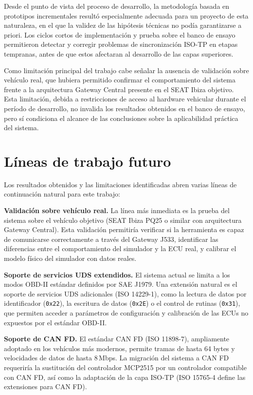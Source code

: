 Desde el punto de vista del proceso de desarrollo, la metodología basada en prototipos incrementales resultó especialmente adecuada para un proyecto de esta naturaleza, en el que la validez de las hipótesis técnicas no podía garantizarse a priori. Los ciclos cortos de implementación y prueba sobre el banco de ensayo permitieron detectar y corregir problemas de sincronización ISO-TP en etapas tempranas, antes de que estos afectaran al desarrollo de las capas superiores.

Como limitación principal del trabajo cabe señalar la ausencia de validación sobre vehículo real, que hubiera permitido confirmar el comportamiento del sistema frente a la arquitectura Gateway Central presente en el SEAT Ibiza objetivo. Esta limitación, debida a restricciones de acceso al hardware vehicular durante el período de desarrollo, no invalida los resultados obtenidos en el banco de ensayo, pero sí condiciona el alcance de las conclusiones sobre la aplicabilidad práctica del sistema.


\section{Líneas de trabajo futuro}
\label{sec:trabajo_futuro}

Los resultados obtenidos y las limitaciones identificadas abren varias líneas de continuación natural para este trabajo:

\textbf{Validación sobre vehículo real.} La línea más inmediata es la prueba del sistema sobre el vehículo objetivo (SEAT Ibiza PQ25 o similar con arquitectura Gateway Central). Esta validación permitiría verificar si la herramienta es capaz de comunicarse correctamente a través del Gateway J533, identificar las diferencias entre el comportamiento del simulador y la ECU real, y calibrar el modelo físico del simulador con datos reales.

\textbf{Soporte de servicios UDS extendidos.} El sistema actual se limita a los modos OBD-II estándar definidos por SAE J1979. Una extensión natural es el soporte de servicios UDS adicionales (ISO 14229-1), como la lectura de datos por identificador (\texttt{0x22}), la escritura de datos (\texttt{0x2E}) o el control de rutinas (\texttt{0x31}), que permiten acceder a parámetros de configuración y calibración de las ECUs no expuestos por el estándar OBD-II.

\textbf{Soporte de CAN FD.} El estándar CAN FD (ISO 11898-7), ampliamente adoptado en los vehículos más modernos, permite tramas de hasta 64 bytes y velocidades de datos de hasta 8\,Mbps. La migración del sistema a CAN FD requeriría la sustitución del controlador MCP2515 por un controlador compatible con CAN FD, así como la adaptación de la capa ISO-TP (ISO 15765-4 define las extensiones para CAN FD).


